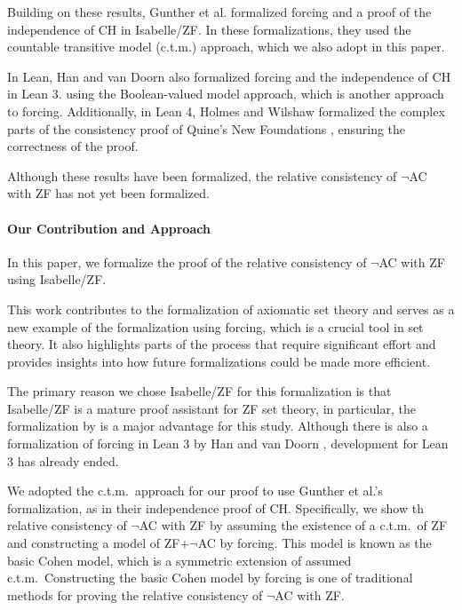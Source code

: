 \documentclass{report}
\begin{document}
Building on these results, Gunther et al. formalized forcing and a proof of the independence of CH \cite{gunther_forcing,gunther_independence} in Isabelle/ZF.
In these formalizations, they used the countable transitive model (c.t.m.) approach, 
which we also adopt in this paper.

In Lean, Han and van Doorn also formalized forcing and the independence of CH \cite{flypitch} in Lean 3.
using the Boolean-valued model approach, which is another approach to forcing.
Additionally, in Lean 4, Holmes and Wilshaw formalized the complex parts of the consistency proof of Quine's New Foundations \cite{NF_consistency}, ensuring the correctness of the proof.

Although these results have been formalized, 
the relative consistency of $\neg$AC with ZF has not yet been formalized. 

\paragraph{Our Contribution and Approach}

In this paper, we formalize the proof of the relative consistency of $\neg$AC with ZF using Isabelle/ZF.

This work contributes to the formalization of axiomatic set theory 
and serves as a new example of the formalization using forcing, which is a crucial tool in set theory.
It also highlights parts of the process that require significant effort 
and provides insights into how future formalizations could be made more efficient.

The primary reason we chose Isabelle/ZF for this formalization is that Isabelle/ZF is a mature proof assistant for ZF set theory,
in particular, the formalization by \cite{gunther_forcing} is a major advantage for this study.
Although there is also a formalization of forcing in Lean 3 by Han and van Doorn \cite{flypitch}, development for Lean 3 has already ended.

We adopted the c.t.m.\  approach for our proof to use Gunther et al.'s formalization, as in their independence proof of CH.
Specifically, we show th relative consistency of $\neg$AC with ZF 
by assuming the existence of a c.t.m.\  of ZF and constructing a model of ZF+$\neg$AC by forcing.
This model is known as the basic Cohen model, which is a symmetric extension of assumed c.t.m.\ 
Constructing the basic Cohen model by forcing is 
one of traditional methods for proving the relative consistency of $\neg$AC with ZF.
\end{document}
